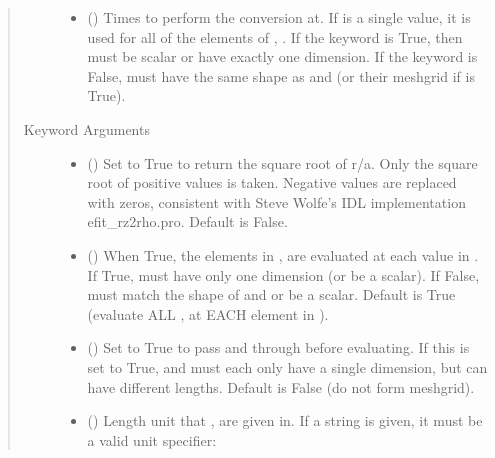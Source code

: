 \documentclass[letterpaper,10pt,english]{sphinxmanual}
\begin{document}
\begin{fulllineitems}
\begin{fulllineitems}
\begin{quote}
\begin{description}
\begin{itemize}
\item {} 
 () \textendash{} Times to perform the conversion at.
If  is a single value, it is used for all of the elements of
, . If the  keyword is True, then  must be
scalar or have exactly one dimension. If the  keyword is
False,  must have the same shape as  and  (or their
meshgrid if  is True).

\end{itemize}

\item[{Keyword Arguments}] \leavevmode\begin{itemize}
\item {} 
 () \textendash{} Set to True to return the square root of r/a.
Only the square root of positive values is taken. Negative
values are replaced with zeros, consistent with Steve Wolfe’s
IDL implementation efit\_rz2rho.pro. Default is False.

\item {} 
 () \textendash{} When True, the elements in ,  are evaluated
at each value in . If True,  must have only one dimension
(or be a scalar). If False,  must match the shape of  and
 or be a scalar. Default is True (evaluate ALL ,  at
EACH element in ).

\item {} 
 () \textendash{} Set to True to pass  and  through
 before evaluating. If this is set to
True,  and  must each only have a single dimension, but
can have different lengths. Default is False (do not form
meshgrid).

\item {} 
 () \textendash{} 
Length unit that ,  are given in.
If a string is given, it must be a valid unit specifier:
\begin{quote}



\end{quote}
\end{itemize}
\end{description}
\end{quote}
\end{fulllineitems}
\end{fulllineitems}
\end{document}
